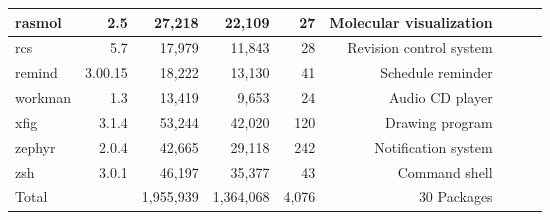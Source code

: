 \begin{tabular}{|l|r|r|r|r|r|r|r|l|}
rasmol & 2.5 & 27,218 & 22,109 & 27 & Molecular visualization\\\hline
rcs & 5.7 & 17,979 & 11,843 & 28 & Revision control system \\\hline
remind & 3.00.15 & 18,222 & 13,130 & 41 & Schedule reminder \\\hline
workman & 1.3 & 13,419 & 9,653 & 24 & Audio CD player \\\hline
xfig & 3.1.4 & 53,244 & 42,020 & 120 & Drawing program \\\hline
zephyr & 2.0.4 & 42,665 & 29,118 & 242 & Notification system \\\hline
zsh & 3.0.1 & 46,197 & 35,377 & 43 & Command shell \\\hline
\hline
Total & & 1,955,939 & 1,364,068 & 4,076 & 30 Packages\\\hline
\end{tabular}

